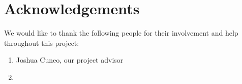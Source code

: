 \documentclass[12pt]{article}
\begin{document}
\newpage %
\section*{Acknowledgements} %
We would like to thank the following people for their involvement and help throughout this project:


\begin{enumerate} %
    \item Joshua Cuneo, our project advisor
    \item 
\end{enumerate}

\newpage %
\tableofcontents %
\newpage
\listoflistings
\newpage 
\listoffigures %
\end{document}
